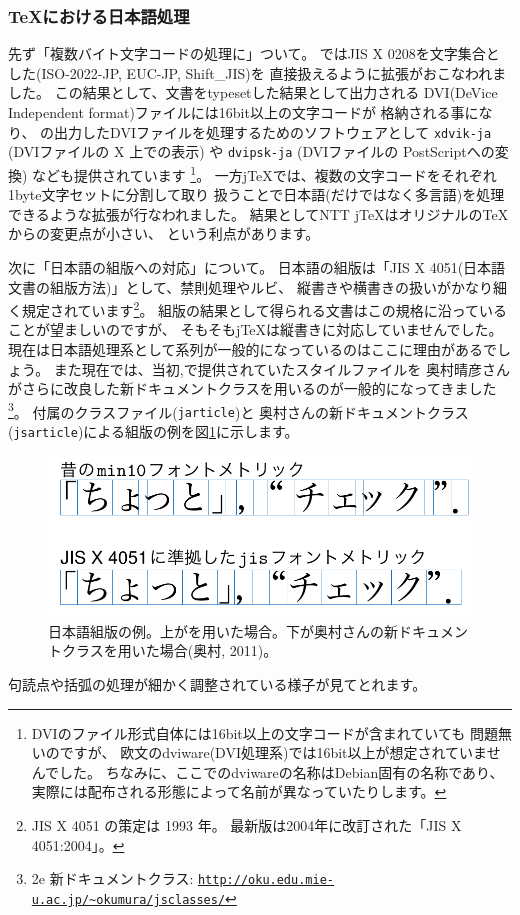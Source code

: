 \documentclass[mingoth,a4paper]{jsarticle}
\begin{document}
\subsubsection{{\TeX}における日本語処理}

先ず「複数バイト文字コードの処理に」ついて。
%
{\pTeX}ではJIS X 0208を文字集合とした(ISO-2022-JP, EUC-JP, Shift\_JIS)を
直接扱えるように拡張がおこなわれました。
この結果として、{\pLaTeX}文書をtypesetした結果として出力される
DVI(DeVice Independent format)ファイルには16bit以上の文字コードが
格納される事になり、
{\pTeX}の出力したDVIファイルを処理するためのソフトウェアとして
{\tt{xdvik-ja}} (DVIファイルの X 上での表示) や
{\tt{dvipsk-ja}} (DVIファイルの PostScriptへの変換) なども提供されています
\footnote{%
  DVIのファイル形式自体には16bit以上の文字コードが含まれていても
  問題無いのですが、
  欧文のdviware(DVI処理系)では16bit以上が想定されていませんでした。
  ちなみに、ここでのdviwareの名称はDebian固有の名称であり、
  実際には配布される形態によって名前が異なっていたりします。
}。
%
一方j{\TeX}では、複数の文字コードをそれぞれ1byte文字セットに分割して取り
扱うことで日本語(だけではなく多言語)を処理できるような拡張が行なわれました。
結果としてNTT j{\TeX}はオリジナルの{\TeX}からの変更点が小さい、
という利点があります。

次に「日本語の組版への対応」について。
%
日本語の組版は「JIS X 4051(日本語文書の組版方法)」として、禁則処理やルビ、
縦書きや横書きの扱いがかなり細く規定されています\footnote{%
  JIS X 4051 の策定は 1993 年。
  最新版は2004年に改訂された「JIS X 4051:2004」。
}。
%
組版の結果として得られる文書はこの規格に沿っていることが望ましいのですが、
そもそもj{\TeX}は縦書きに対応していませんでした。
現在は日本語処理系として{\pTeX}系列が一般的になっているのはここに理由があるでしょう。
%
また現在では、当初{\pTeX,\pLaTeX}で提供されていたスタイルファイルを
奥村晴彦さんがさらに改良した新ドキュメントクラスを用いるのが一般的になってきました%
\footnote{%
  \pLaTeX2e 新ドキュメントクラス: {\tt{\url{http://oku.edu.mie-u.ac.jp/~okumura/jsclasses/}}}
}。
{\pLaTeX}付属のクラスファイル({\tt{jarticle}})と
奥村さんの新ドキュメントクラス({\tt{jsarticle}})による組版の例を図\ref{fig:jisx0451}に示します。
%
\begin{figure}[htbp!]
  \centering
  \includegraphics[width=.4\linewidth]{./image2012-gum/Okumura2011.png}
  \caption{日本語組版の例。上が{\pLaTeX}を用いた場合。下が奥村さんの新ドキュメントクラスを用いた場合(奥村, 2011)。}
  \label{fig:jisx0451}
  \vspace{-1em}
\end{figure}
句読点や括弧の処理が細かく調整されている様子が見てとれます。
\end{document}
